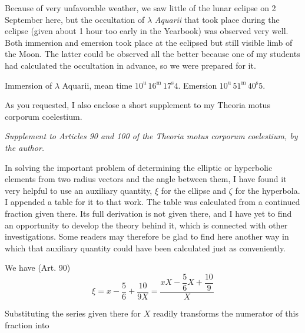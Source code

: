 \par\indent Because of very unfavorable weather, we saw little of the lunar eclipse on 2 September here, but the occultation of $\lambda$ \emph{Aquarii} that took place during the eclipse (given about 1 hour too early in the Yearbook) was observed very well. Both immersion and emersion took place at the eclipsed but still visible limb of the Moon. The latter could be observed all the better because one of my students had calculated the occultation in advance, so we were prepared for it.

\par\indent Immersion of $\lambda$ Aquarii, mean time $10^{\mathrm u}\,16^{\mathrm m}\,17^{\mathrm s}4$. Emersion $10^{\mathrm u}\,51^{\mathrm m}\,40^{\mathrm s}5$.

\par\indent As you requested, I also enclose a short supplement to my Theoria motus corporum coelestium.
\begin{center}\emph{Supplement to Articles 90 and 100 of the Theoria motus corporum coelestium, by the author.}\end{center}
\par\indent In solving the important problem of determining the elliptic or hyperbolic elements from two radius vectors and the angle between them, I have found it very helpful to use an auxiliary quantity, $\xi$ for the ellipse and $\zeta$ for the hyperbola. I appended a table for it to that work. The table was calculated from a continued fraction given there. Its full derivation is not given there, and I have yet to find an opportunity to develop the theory behind it, which is connected with other investigations. Some readers may therefore be glad to find here another way in which that auxiliary quantity could have been calculated just as conveniently.

\par\indent We have (Art. 90)
\[
\xi=x-\frac{5}{6}+\frac{10}{9X}=\frac{xX-\dfrac{5}{6}X+\dfrac{10}{9}}{X}
\]
\par\indent Substituting the series given there for $X$ readily transforms the numerator of this fraction into

